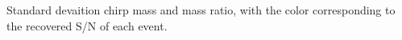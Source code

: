\label{fig:mass_std_snr} Standard devaition chirp mass and mass ratio, with the color corresponding to the recovered S/N of each event.